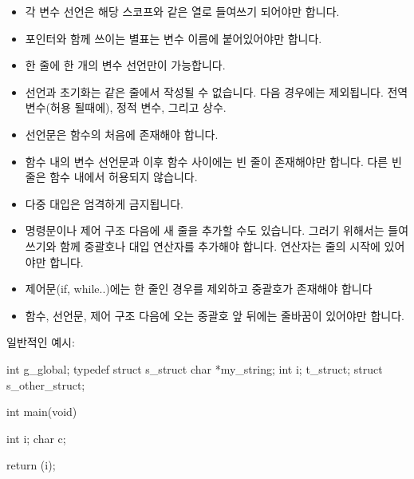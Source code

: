\documentclass{42-ko}
\begin{document}
\begin{itemize}
                \item 각 변수 선언은 해당 스코프와 같은 열로 들여쓰기 되어야만 합니다.

                \item 포인터와 함께 쓰이는 별표는 변수 이름에 붙어있어야만 합니다.

                \item 한 줄에 한 개의 변수 선언만이 가능합니다.

                \item 선언과 초기화는 같은 줄에서 작성될 수 없습니다.
                  다음 경우에는 제외됩니다.
                  전역 변수(허용 될때에), 정적 변수, 그리고 상수.

                \item 선언문은 함수의 처음에 존재해야 합니다.

                \item 함수 내의 변수 선언문과 이후 함수 사이에는 빈 줄이
                  존재해야만 합니다. 다른 빈 줄은 함수 내에서 허용되지 않습니다.

                \item 다중 대입은 엄격하게 금지됩니다.

                \item 명령문이나 제어 구조 다음에 새 줄을 추가할 수도 있습니다.
                  그러기 위해서는 들여쓰기와 함께 중괄호나 대입 연산자를
                  추가해야 합니다. 연산자는 줄의 시작에 있어야만 합니다.

                \item 제어문(if, while..)에는 한 줄인 경우를 제외하고 
                  중괄호가 존재해야 합니다

                \item 함수, 선언문, 제어 구조 다음에 오는 중괄호 앞 뒤에는
                  줄바꿈이 있어야만 합니다.

            \end{itemize}

            \newpage

            일반적인 예시:
            \begin{42ccode}
int             g_global;
typedef struct  s_struct
{
    char    *my_string;
    int     i;
}               t_struct;
struct          s_other_struct;

int     main(void)
{
    int     i;
    char    c;

    return (i);
}
            \end{42ccode}
            \newpage
\end{document}
